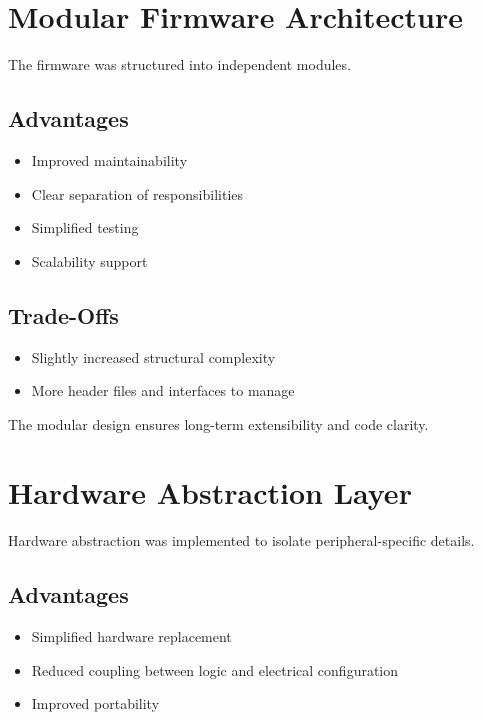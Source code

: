 
\section{Modular Firmware Architecture}

The firmware was structured into independent modules.

\subsection{Advantages}

\begin{itemize}
	\item Improved maintainability
	\item Clear separation of responsibilities
	\item Simplified testing
	\item Scalability support
\end{itemize}

\subsection{Trade-Offs}

\begin{itemize}
	\item Slightly increased structural complexity
	\item More header files and interfaces to manage
\end{itemize}

The modular design ensures long-term extensibility and code clarity.


\section{Hardware Abstraction Layer}

Hardware abstraction was implemented to isolate peripheral-specific details.

\subsection{Advantages}

\begin{itemize}
	\item Simplified hardware replacement
	\item Reduced coupling between logic and electrical configuration
	\item Improved portability
\end{itemize}

